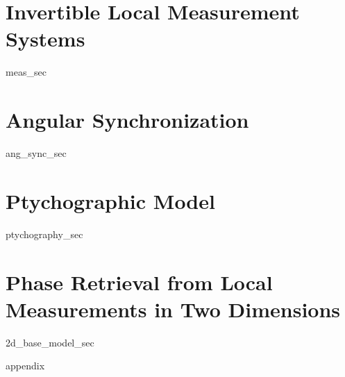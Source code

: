 \documentclass[12pt]{ucsd-thesis-2018}
\begin{document}
\chapter{Invertible Local Measurement Systems}
\label{ch:span_fam}
{meas_sec}

\chapter{Angular Synchronization}
{ang_sync_sec}

\chapter{Ptychographic Model}
\label{ch:ptychography}
{ptychography_sec}

\chapter{Phase Retrieval from Local Measurements in Two Dimensions}
{2d_base_model_sec}



\appendix
{appendix}

{
}
\end{document}
